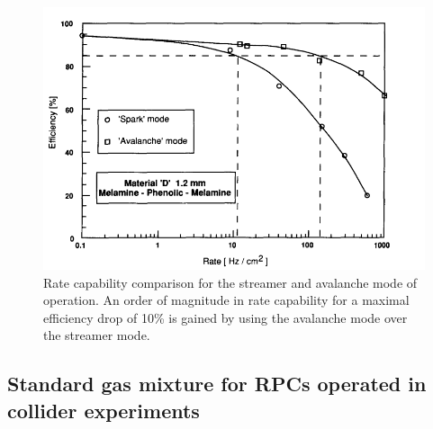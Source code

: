 	\begin{figure}[H]
		\centering
		\includegraphics[width = 0.7\linewidth]{fig/chapt3/Rate_Mode_Comparison.png}
		\caption{\label{fig:ModeRate} Rate capability comparison for the streamer and avalanche mode of operation. An order of magnitude in rate capability for a maximal efficiency drop of 10\% is gained by using the avalanche mode over the streamer mode.}
	\end{figure}
	
\newpage

	\subsection{Standard gas mixture for RPCs operated in collider experiments}
	\label{chat4:ssec:gasmix}
	
\begingroup\setlength{\intextsep}{5pt}\setlength{\columnsep}{15pt}
	
